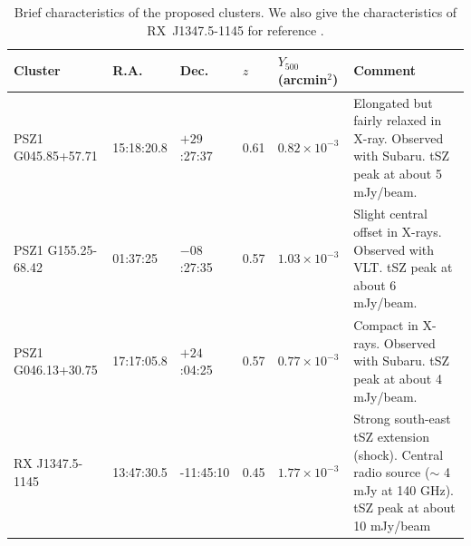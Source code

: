 \documentclass[11pt,a4paper,twoside,graphicx,color]{article}
\begin{document}
{%
\begin{table}
\begin{center}
\resizebox{\textwidth}{!} {
\begin{tabular}{|p{3.4cm}|p{1.6cm}|p{1.6cm}|p{0.6cm}|p{1.8cm}|p{7.3cm}|}
\hline
Cluster & R.A. & Dec. & $z$ & $Y_{500}$ (arcmin$^2$) & Comment \\
\hline
PSZ1 G045.85+57.71 & 15:18:20.8 & $+29$:27:37 & 0.61 & $0.82 \times 10^{-3}$& Elongated but fairly relaxed in \mbox{X-ray}. Observed with Subaru. tSZ peak at about 5 mJy/beam.\\
PSZ1 G155.25-68.42 & 01:37:25 & $-08$:27:35  & 0.57 & $1.03 \times 10^{-3}$ & Slight central offset in X-rays. Observed with VLT. tSZ peak at about 6 mJy/beam.\\
PSZ1 G046.13+30.75 & 17:17:05.8 & $+24$:04:25 & 0.57 & $0.77 \times 10^{-3}$ & Compact in X-rays. Observed with Subaru. tSZ peak at about 4 mJy/beam. \\
\hline
RX J1347.5-1145 & 13:47:30.5 & -11:45:10 & 0.45 & $1.77 \times 10^{-3}$  & Strong south-east tSZ extension (shock). Central radio source ($\sim$ 4 mJy at 140 GHz). tSZ peak at about 10 mJy/beam\\
\hline
\end{tabular}
}
\end{center}
\caption{\footnotesize Brief characteristics of the proposed clusters. We also give the characteristics of \mbox{RX~J1347.5-1145} for reference \cite{adam2013}. }
\label{tab:list_gc}
\end{table}

}
\end{document}
